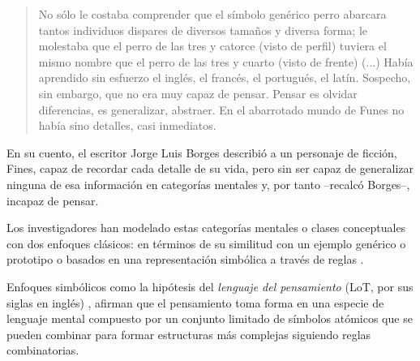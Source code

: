\blockquote{No sólo le costaba comprender que el símbolo genérico perro abarcara tantos individuos dispares de diversos tamaños y diversa forma; le molestaba que el perro de las tres y catorce (visto de perfil) tuviera el mismo nombre que el perro de las tres y cuarto (visto de frente) (...) Había aprendido sin esfuerzo el inglés, el francés, el portugués, el latín. Sospecho, sin
embargo, que no era muy capaz de pensar. Pensar es olvidar diferencias, es generalizar, abstraer. En el abarrotado mundo de Funes no había sino detalles, casi inmediatos. \cite{funes}}


En su cuento, el escritor Jorge Luis Borges describió a un personaje de ficción, Fines, capaz de recordar cada detalle de su vida, pero sin ser capaz de generalizar ninguna de esa información en categorías mentales y, por tanto --recalcó Borges--, incapaz de pensar.


Los investigadores han modelado estas categorías mentales o clases conceptuales con dos enfoques clásicos: en términos de su similitud con un ejemplo genérico o prototipo \cite{rosch1999principles,nosofsky1986attention,rosch1976structural,rosch1975family} o basados en una representación simbólica a través de reglas  \cite{boole1854investigation,fodor1975language,gentner1983structure}.


Enfoques simbólicos como la hipótesis del \textit{lenguaje del pensamiento} (LoT, por sus siglas en inglés) \cite{fodor1975language}, afirman que el pensamiento toma forma en una especie de lenguaje mental compuesto por un conjunto limitado de símbolos atómicos que se pueden combinar para formar estructuras más complejas siguiendo reglas combinatorias.

